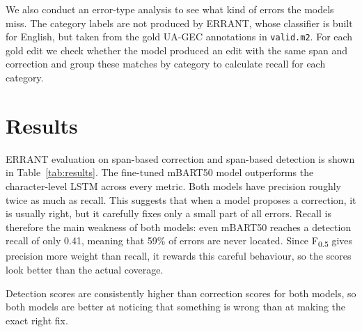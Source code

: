 \documentclass[11pt]{article}
\begin{document}
We also conduct an error-type analysis to see what kind of errors the models miss. The category labels are not produced by ERRANT, whose classifier is built for English, but taken from the gold UA-GEC annotations in \texttt{valid.m2}. For each gold edit we check whether the model produced an edit with the same span and correction and group these matches by category to calculate recall for each category.



\section{Results}
\label{sec:results}

ERRANT evaluation on span-based correction and span-based detection is shown in Table~\ref{tab:results}. The fine-tuned mBART50 model outperforms the character-level LSTM across every metric. Both models have precision roughly twice as much as recall. This suggests that when a model proposes a correction, it is usually right, but it carefully fixes only a small
part of all errors. Recall is therefore the main weakness of both models: even mBART50 reaches a detection recall of only 0.41, meaning that 59\% of errors are never located.  Since F\textsubscript{0.5} gives precision more weight than recall, it rewards this careful behaviour, so the scores look better than the actual coverage.

Detection scores are consistently higher than correction scores for both models, so both models are better at noticing that something is wrong than at making the exact right fix.



\begin{table}[h]
\centering
{}
\caption{ERRANT evaluation on the UA-GEC validation set, comparing the character-level LSTM against a fine-tuned mBART50.}
\label{tab:results}
\end{table}
\end{document}
